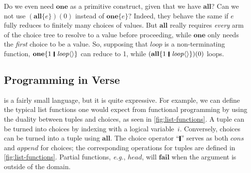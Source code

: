 \documentclass[acmsmall]{acmart}
\newcommand{\Varid}[1]{\mathit{#1}}
\newcommand{\eg}{\emph{e.g.}\xspace}
\begin{document}
Do we even need \ensuremath{\textbf{one}} as a primitive construct, given that we have
\ensuremath{\textbf{all}}? Can we not use \ensuremath{(\textbf{all}\{\Varid{e}\})(\mathrm{0})} instead of \ensuremath{\textbf{one}\{\Varid{e}\}}? Indeed,
they behave the same if \ensuremath{\Varid{e}} fully reduces to finitely many choices of
values. But \ensuremath{\textbf{all}} really requires \emph{every} arm of the choice tree to resolve to a value
before proceeding, while \ensuremath{\textbf{one}} only needs the
\emph{first} choice to be a value. So, supposing that \ensuremath{\Varid{loop}} is a non-terminating function,
\ensuremath{\textbf{one}\{\mathrm{1}\hspace{0.2em}\mathop{\rule[-0.1em]{0.15em}{0.75em}}\hspace{0.2em}\Varid{loop}\langle\rangle\}} can reduce to 1, while
\ensuremath{(\textbf{all}\{\mathrm{1}\hspace{0.2em}\mathop{\rule[-0.1em]{0.15em}{0.75em}}\hspace{0.2em}\Varid{loop}\langle\rangle\})(\mathrm{0})} loops.

\subsection{Programming in Verse}  \label{sec:verse}

\versecalc{} is a fairly small language, but it is quite expressive.
For example, we can define the typical list functions one would expect from functional programming
by using the duality between tuples and choices, as seen in \cref{fig:list-functions}.
A tuple can be turned into choices by indexing with a logical variable~\ensuremath{\Varid{i}}.
Conversely, choices can be turned into a tuple using \ensuremath{\textbf{all}}.
The choice operator ``\ensuremath{\rule[-0.1em]{0.15em}{0.75em}}'' serves as both \ensuremath{\Varid{cons}} and \ensuremath{\Varid{append}} for choices;
the corresponding operations for tuples are defined in \cref{fig:list-functions}.
Partial functions, \eg, \ensuremath{\Varid{head}}, will \ensuremath{\textbf{fail}} when the argument is outside of the domain.
\end{document}
